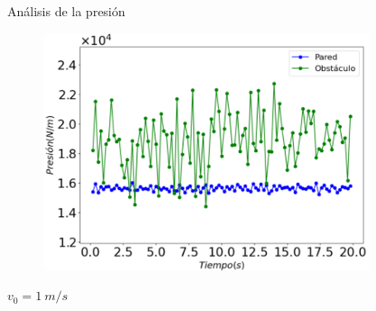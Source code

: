 \begin{frame}{Análisis de la presión}
    \begin{minipage}{0.8\textwidth}
        \begin{figure}[H]
            \centering
            \includegraphics[width=0.85\textwidth]{pic/1.1/v1}
            \label{fig:tempvstime}
        \end{figure}
    \end{minipage}
    \hfill
    \begin{minipage}{0.15\textwidth}
        $v_0 = 1\ m/s$
    \end{minipage}
\end{frame}

